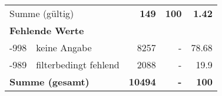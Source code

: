 \begin{longtable}{lXrrr}
     \midrule
     \multicolumn{2}{l}{Summe (gültig)} &
       \textbf{\num{149}} &
     \textbf{100} &
       \textbf{\num[round-mode=places,round-precision=2]{1,42}} \\
     \multicolumn{5}{l}{\textbf{Fehlende Werte}}\\
       -998 &
       keine Angabe &
         \num{8257} &
        - &
         \num[round-mode=places,round-precision=2]{78,68} \\
       -989 &
       filterbedingt fehlend &
         \num{2088} &
        - &
         \num[round-mode=places,round-precision=2]{19,9} \\
     \midrule
     \multicolumn{2}{l}{\textbf{Summe (gesamt)}} &
          \textbf{\num{10494}} &
        \textbf{-} &
        \textbf{100} \\
     \bottomrule
     \end{longtable}
     
